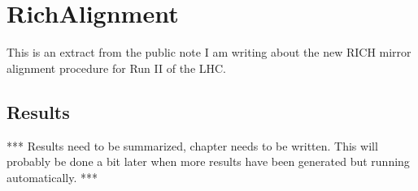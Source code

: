 \chapter{RichAlignment}
This is an extract from the public note I am writing about the new RICH mirror alignment procedure for Run II of the LHC.\\



\section{Results}
*** Results need to be summarized, chapter needs to be written. This will probably be done a bit later when more results have been generated but running automatically. ***

 